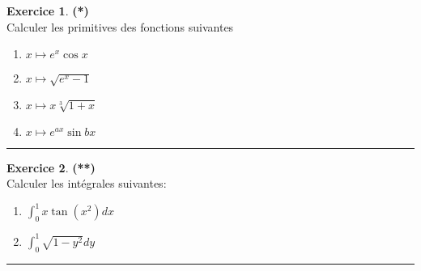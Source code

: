 \documentclass[a4paper,11pt]{article}
\theoremstyle{definition}
\newtheorem{exo}{Exercice} %
\begin{document}
\begin{minipage}{1\linewidth}
	\begin{minipage}[t]{0.48\linewidth}
		\raggedright

\begin{exo}\textbf{(*)}\quad\\[0.2cm]
	Calculer les primitives des fonctions suivantes
	\begin{multicols}{2}
		\begin{enumerate}
		\item $x\mapsto e^x \cos x $
		\item $x\mapsto \sqrt{e^x -1} $
		\item $x\mapsto x \sqrt[3]{1 + x } $
		\item $x \longmapsto e^{ax} \sin b x $
	\end{enumerate}
	\end{multicols}

	\centering
	\rule{1\linewidth}{0.6pt}
\end{exo}










\begin{exo}\textbf{(**)}\quad\\[0.2cm]
	Calculer les intégrales suivantes:
	\begin{multicols}{2}
		\begin{enumerate}
			\item $\int_{0}^{1}x \tan(x^2) dx$
			\item $\int_{0}^{1}\sqrt{1-y^2} dy$ %
		\end{enumerate}
	\end{multicols}
	
	
	
	
	\centering
	\rule{1\linewidth}{0.6pt}
\end{exo}


\end{minipage}
\end{minipage}
\end{document}
